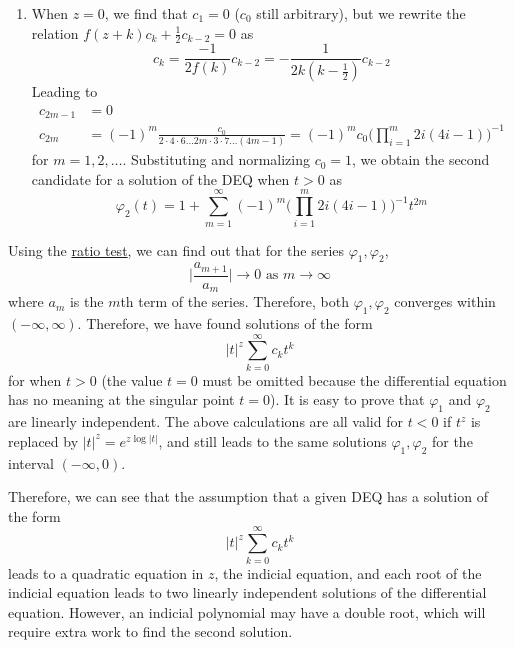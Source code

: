 \documentclass{article}
\newcounter{example}[section]
\begin{document}
\begin{example}
\begin{enumerate}
          \item When $z = 0$, we find that $c_1 = 0$ ($c_0$ still arbitrary), but we rewrite the relation $f(z+k) c_k + \frac{1}{2} c_{k-2} = 0$ as 
          \begin{equation}
            c_k = \frac{-1}{2 f(k)} c_{k-2} = -\frac{1}{2k (k-\frac{1}{2})} c_{k-2}
          \end{equation}
          Leading to
          \begin{align*}
              c_{2m-1} & = 0 \\
              c_{2m} & = (-1)^m \frac{c_0}{2 \cdot 4 \cdot 6 \ldots 2m \cdot 3 \cdot 7 \ldots (4m-1)} = (-1)^m c_0 \bigg( \prod_{i=1}^m 2i (4i - 1) \bigg)^{-1}
          \end{align*}
          for $m = 1, 2, \ldots $. Substituting and normalizing $c_0 = 1$, we obtain the second candidate for a solution of the DEQ when $t>0$ as
          \begin{equation}
            \varphi_2 (t) = 1 + \sum_{m=1}^\infty (-1)^m \bigg( \prod_{i=1}^m 2i (4i - 1) \bigg)^{-1} t^{2m}
          \end{equation}
      \end{enumerate}
      Using the \hyperref[real-thm:ratio-test]{ratio test}, we can find out that for the series $\varphi_1, \varphi_2$, 
      \begin{equation}
        \bigg|\frac{a_{m+1}}{a_{m}}\bigg| \rightarrow 0 \text{ as } m \rightarrow \infty
      \end{equation}
      where $a_m$ is the $m$th term of the series. Therefore, both $\varphi_1, \varphi_2$ converges within $(-\infty, \infty)$. Therefore, we have found solutions of the form 
      \begin{equation}
        |t|^z \sum_{k=0}^\infty c_k t^k
      \end{equation}
      for when $t>0$ (the value $t=0$ must be omitted because the differential equation has no meaning at the singular point $t=0$). It is easy to prove that $\varphi_1$ and $\varphi_2$ are linearly independent. The above calculations are all valid for $t<0$ if $t^z$ is replaced by $|t|^z = e^{z \log{|t|}}$, and still leads to the same solutions $\varphi_1, \varphi_2$ for the interval $(-\infty, 0)$.
      \end{example}

      Therefore, we can see that the assumption that a given DEQ has a solution of the form 
      \begin{equation}
        |t|^z \sum_{k=0}^\infty c_k t^k
      \end{equation}
      leads to a quadratic equation in $z$, the indicial equation, and each root of the indicial equation leads to two linearly independent solutions of the differential equation. However, an indicial polynomial may have a double root, which will require extra work to find the second solution. 
\end{document}

